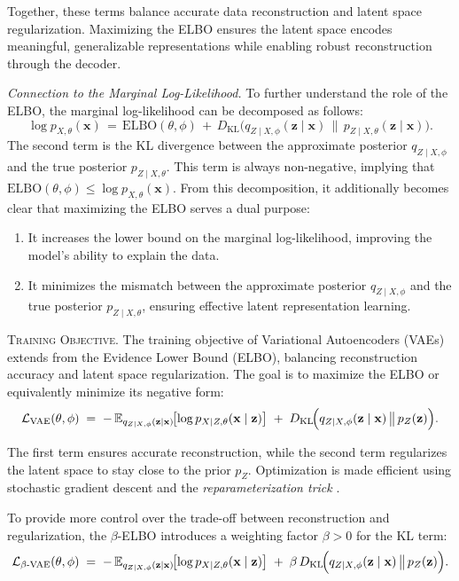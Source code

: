Together, these terms balance accurate data reconstruction and latent space regularization. Maximizing the ELBO ensures the latent space encodes meaningful, generalizable representations while enabling robust reconstruction through the decoder.

\textit{Connection to the Marginal Log-Likelihood.} To further understand the role of the ELBO, the marginal log-likelihood can be decomposed as follows:
\[
\log p_{X,\theta}(\mathbf{x}) 
\,=\,
\mathrm{ELBO}(\theta, \phi)
\,+\,
D_{\mathrm{KL}}\big(q_{Z \mid X,\phi}(\mathbf{z} \mid \mathbf{x}) \,\|\, p_{Z \mid X,\theta}(\mathbf{z} \mid \mathbf{x})\big).
\]
The second term is the KL divergence between the approximate posterior \(q_{Z \mid X,\phi}\) and the true posterior \(p_{Z \mid X,\theta}\). This term is always non-negative, implying that \(\mathrm{ELBO}(\theta, \phi) \leq \log p_{X,\theta}(\mathbf{x})\). From this decomposition, it additionally becomes clear that maximizing the ELBO serves a dual purpose:
\begin{enumerate}
    \item It increases the lower bound on the marginal log-likelihood, improving the model's ability to explain the data.
    \item It minimizes the mismatch between the approximate posterior \(q_{Z \mid X,\phi}\) and the true posterior \(p_{Z \mid X,\theta}\), ensuring effective latent representation learning.
\end{enumerate}



\textsc{Training Objective.} The training objective of Variational Autoencoders (VAEs) extends from the Evidence Lower Bound (ELBO), balancing reconstruction accuracy and latent space regularization. The goal is to maximize the ELBO or equivalently minimize its negative form:
\[
\mathcal{L}_{\text{VAE}}(\theta, \phi)
\;=\;
-\,\mathbb{E}_{q_{Z \mid X,\phi}(\mathbf{z}\mid \mathbf{x})}\!
\bigl[\log p_{X \mid Z, \theta}(\mathbf{x}\mid \mathbf{z})\bigr]
\;+\;
D_{\mathrm{KL}}\!\Bigl(
    q_{Z \mid X,\phi}(\mathbf{z}\mid \mathbf{x})
    \,\bigl\|\,
    p_{Z}(\mathbf{z})
\Bigr).
\]

The first term ensures accurate reconstruction, while the second term regularizes the latent space to stay close to the prior \(p_Z\). Optimization is made efficient using stochastic gradient descent and the \emph{reparameterization trick} \citep{kingma2013auto}.

To provide more control over the trade-off between reconstruction and regularization, the \(\beta\)-ELBO \citep{higgins2017beta} introduces a weighting factor \(\beta > 0\) for the KL term:
\[
\mathcal{L}_{\beta\text{-VAE}}(\theta, \phi)
\;=\;
-\,\mathbb{E}_{q_{Z \mid X,\phi}(\mathbf{z}\mid \mathbf{x})}\!
\bigl[\log p_{X \mid Z, \theta}(\mathbf{x}\mid \mathbf{z})\bigr]
\;+\;
\beta \, D_{\mathrm{KL}}\!\Bigl(
    q_{Z \mid X,\phi}(\mathbf{z}\mid \mathbf{x})
    \,\bigl\|\,
    p_{Z}(\mathbf{z})
\Bigr).
\]

